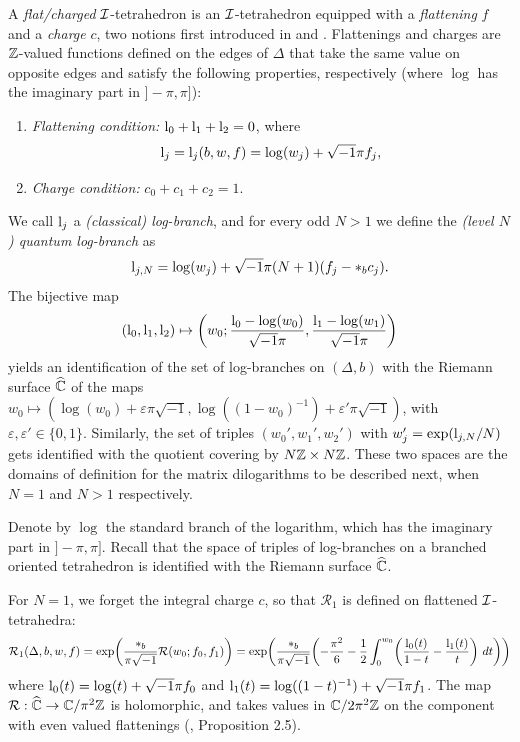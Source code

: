 A {\it flat/charged} ${\mathcal I}$-tetrahedron is an ${\mathcal I}$-tetrahedron
equipped with a {\it flattening} $f$ and a {\it charge} $c$, two
notions first introduced in \cite{N0} and \cite{N}. Flattenings
and charges are ${\mathbb Z}$-valued functions defined on the
edges of $\Delta$ that take the same value on opposite edges and
satisfy the following properties, respectively (where $\log$ has
the imaginary part in $]-\pi,\pi]$):
\begin{enumerate}
\item[F.] {\it Flattening condition:} ${\rm l}_0 + {\rm l}_1 +{\rm
    l}_2 = 0$, where
\begin{equation}\label{clb}
{\rm l}_j = {\rm l}_j(b,w,f)= \log(w_j) + \sqrt{-1}\pi f_j,
\end{equation}
\item[C.] {\it Charge condition:} $c_0+c_1+c_2=1$.
\end{enumerate}
We call ${\rm l}_j$ a {\it (classical) log-branch}, and for every
odd $N>1$ we define the \emph{(level $N$) quantum log-branch} as
\begin{equation}\label{qlb}
{\rm l}_{j,N} = \log(w_j) + \sqrt{-1}\pi (N+1)(f_j -*_bc_j).
\end{equation}
The bijective map $$({\rm l}_0,{\rm l}_1,{\rm l}_2) \mapsto
\left(w_0;\frac{{\rm l}_0-\log(w_0)}{\sqrt{-1}\pi},\frac{{\rm
l}_1-\log(w_1)}{\sqrt{-1}\pi}\right)$$ yields an identification of the
set of log-branches on $(\Delta,b)$ with the Riemann surface
$\widehat{\mathbb{C}}$ of the maps $w_0\mapsto
(\log(w_0)+\varepsilon\pi\sqrt{-1},\log((1-w_0)^{-1})+
\varepsilon'\pi\sqrt{-1})$, with $\varepsilon,\varepsilon'\in
\{0,1\}$. Similarly, the set of triples $(w_0',w_1',w_2')$ with
$w_j'=\exp({\rm l}_{j,N}/N)$ gets identified with the quotient
covering by $N\mathbb{Z}\times N\mathbb{Z}$. These two spaces are the domains of
definition for the matrix dilogarithms to be described next, when
$N=1$ and $N>1$ respectively.
\medskip

  Denote by $\log$ the standard
branch of the logarithm, which has the imaginary part in
$]-\pi,\pi]$. Recall that the space of triples of log-branches on a
    branched oriented tetrahedron is identified with the Riemann surface
    $\widehat{\mathbb{C}}$. 
\smallskip

For $N=1$, we forget the integral charge $c$, so that
$\mathcal{R}_1$ is defined on flattened ${\mathcal I}$-tetrahedra:
\begin{equation}\label{symRmatdil}
\mathcal{R}_1(\Delta,b,w,f) =
\exp\biggl(\frac{*_b}{\pi\sqrt{-1}}\mathcal{R}(w_0;f_0,f_1)\biggr) =
\exp\biggl(\frac{*_b}{\pi\sqrt{-1}}\biggl(-\frac{\pi^2}{6} -
\frac{1}{2} \int_0^{w_0} \biggl( \frac{{\rm l}_0(t)}{1-t} - \frac{{\rm
    l}_1(t)}{t} \biggr) \ dt \biggr) \biggr)
\end{equation}
where ${\rm l}_0(t)=\log(t) + \sqrt{-1}\pi f_0$ and ${\rm
  l}_1(t)=\log((1-t)^{-1}) + \sqrt{-1}\pi f_1$. The map
  $\mathcal{R}:\widehat{\mathbb{C}}\rightarrow \mathbb{C}/\pi^2\mathbb{Z}$ is holomorphic,
  and takes values in $\mathbb{C}/2\pi^2\mathbb{Z}$ on the component with even
  valued flattenings (\cite{N}, Proposition 2.5).  \smallskip

